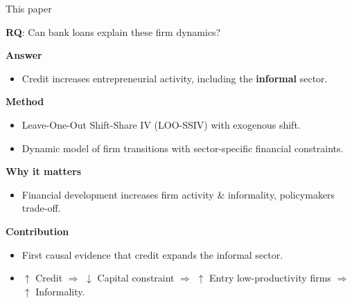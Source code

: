 \documentclass[aspectratio=169]{beamer}
\begin{document}


\begin{frame}{This paper} \label{this_paper}

\begin{center}
    \Large \textbf{RQ}: Can bank loans explain these firm dynamics?
\end{center}

\vspace{2mm}
\pause

\textbf{Answer}
\begin{itemize}
    \item Credit increases entrepreneurial activity, including the \textbf{informal} sector.
\end{itemize}

\vspace{1mm}
\pause

\textbf{Method}
\begin{itemize}
    \item Leave-One-Out Shift-Share IV (LOO-SSIV) with exogenous shift.
    \item Dynamic model of firm transitions with sector-specific financial constraints.
\end{itemize}

\vspace{1mm}
\pause

\textbf{Why it matters}
\begin{itemize}
    \item Financial development increases firm activity \& informality, policymakers trade-off.
\end{itemize}

\vspace{1mm}
\pause

\textbf{Contribution}
\begin{itemize}
    \item First causal evidence that credit expands the informal sector. 
    \item $\uparrow$ Credit $\Rightarrow$ $\downarrow$ Capital constraint $\Rightarrow$ $\uparrow$ Entry low-productivity firms $\Rightarrow$ $\uparrow$ Informality. \hyperlink{literature}{} \hyperlink{data}{} 
\end{itemize}

\end{frame}

\end{document}
